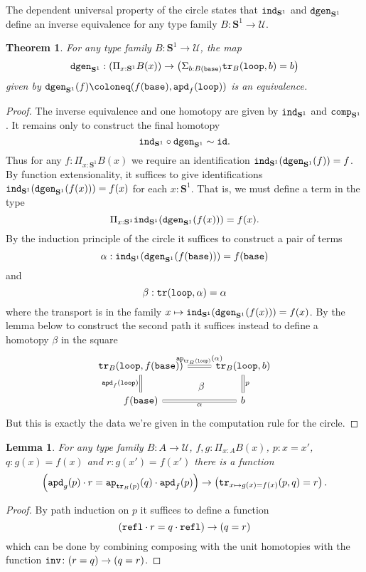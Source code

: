 \documentclass{amsart}
\theoremstyle{theorem}
\newtheorem*{thm}{Theorem}
\newtheorem*{lem}{Lemma}
\theoremstyle{definition}
\theoremstyle{remark}
\newcommand{\0}{\mathbbe{0}}
\newcommand{\1}{\mathbbe{1}}
\newcommand{\2}{\mathbbe{2}}
\newcommand{\3}{\mathbbe{3}}
\newcommand{\4}{\mathbbe{4}}
\newcommand{\term}[1]{{\textup{\texttt{#1}}}}
\newcommand{\id}{\term{id}}
\newcommand{\ind}{\term{ind}}
\newcommand{\refl}{\term{refl}}
\newcommand{\inv}{\term{inv}}
\newcommand{\ap}{\term{ap}}
\newcommand{\tr}{\term{tr}}
\newcommand{\apd}{\term{apd}}
\newcommand{\UU}{{\mathcal{U}}}
\newcommand{\Sone}{\mathbf{S}^1}
\newcommand{\base}{\term{base}}
\newcommand{\lloop}{\term{loop}}
\begin{document}
The dependent universal property of the circle states that $\ind_{\Sone}$ and $\term{dgen}_{\Sone}$ define an inverse equivalence for any type family $B \colon \Sone \to \UU$.

\begin{thm} For any type family $B \colon \Sone \to \UU$, the map
  \[ \term{dgen}_{\Sone} : \left( \Pi_{x: \Sone} B(x) \right) \to \left(\Sigma_{b : B(\base)} \tr_B(\lloop, b) = b\right)\]
  given by $\term{dgen}_{\Sone}(f) \coloneq (f(\base), \apd_f(\lloop))$ is an equivalence.
\end{thm}
\begin{proof}
The inverse equivalence and one homotopy are given by $\ind_{\Sone}$ and $\term{comp}_{\Sone}$. It remains only to construct the final homotopy
\[
\ind_{\Sone} \circ \term{dgen}_{\Sone} \sim \id.  
\]
Thus for any $f : \Pi_{x:\Sone} B(x)$ we require an identification $\ind_{\Sone}(\term{dgen}_{\Sone}(f)) = f$. By function extensionality, it suffices to give identifications $\ind_{\Sone}(\term{dgen}_{\Sone}(f(x))) = f(x)$ for each $x : \Sone$. That is, we must define a term in the type
\[ \Pi_{x : \Sone}\ind_{\Sone}(\term{dgen}_{\Sone}(f(x))) = f(x).\]
By the induction principle of the circle it suffices to construct a pair of terms
\[ \alpha :\ind_{\Sone}(\term{dgen}_{\Sone}(f(\base))) = f(\base)\]
and
\[ \beta : \tr (\lloop, \alpha) = \alpha\]
where the transport is in the family
$x \mapsto \ind_{\Sone}(\term{dgen}_{\Sone}(f(x))) = f(x)$. By the lemma below to construct the second path it suffices instead to define a homotopy $\beta$ in the square
\[
  \begin{tikzcd}
    \tr_B(\lloop, f(\base)) \arrow[d, equals, "\apd_f(\lloop)"'] \arrow[dr, phantom, "\beta"]\arrow[r, equals, "\ap_{\tr_B(\lloop)}(\alpha)"] & \tr_B(\lloop,b) \arrow[d, equals, "p"] \\ f(\base) \arrow[r, equals, "\alpha"'] & b
      \end{tikzcd}
    \]
But this is exactly the data we're given in the computation rule for the circle.
  \end{proof}

\begin{lem} For any type family $B : A \to \UU$, $f,g : \Pi_{x :A } B(x)$, $p : x = x'$, $q :g(x)=f(x)$ and $r : g(x') = f(x')$ there is a function
\[ \left( \apd_g(p) \cdot r = \ap_{\tr_B(p)}(q) \cdot \apd_f(p) \right) \to \left( \tr_{x \mapsto g(x)=f(x)}(p,q) =r \right).\]
\end{lem}
\begin{proof} By path induction on $p$ it suffices to define a function
\[ \left(\refl \cdot r = q \cdot \refl \right) \to \left( q = r \right)\]
which can be done by combining composing with the unit homotopies with the function $\inv \colon (r=q) \to (q=r)$.
\end{proof}
\end{document}
